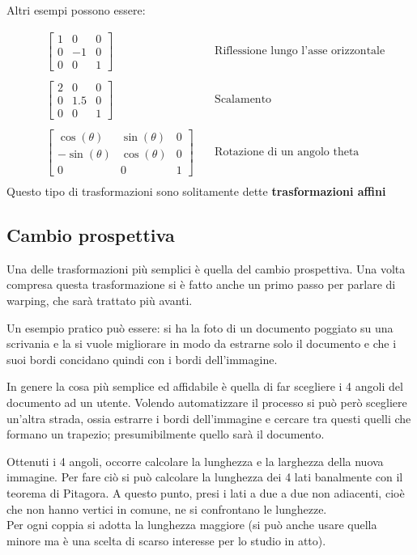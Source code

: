 \noindent 
Altri esempi possono essere:

\begin{align*}
&\begin{bmatrix}
1&0&0\\
0&-1&0\\
0&0&1
\end{bmatrix}&~&
\text{Riflessione lungo l'asse orizzontale}\\
\\
&\begin{bmatrix}
2&0&0\\
0&1.5&0\\
0&0&1
\end{bmatrix}&~&
\text{Scalamento}\\
\\
&\begin{bmatrix}
\cos(\theta )&\sin(\theta )&0\\
-\sin(\theta )&\cos(\theta )&0\\
0&0&1
\end{bmatrix}&~&
\text{Rotazione di un angolo theta}\\
\end{align*}
Questo tipo di trasformazioni sono solitamente dette \textbf{trasformazioni affini}



\subsection{Cambio prospettiva}
Una delle trasformazioni più semplici è quella del cambio prospettiva. Una volta compresa questa trasformazione si è fatto anche un primo passo per parlare di warping, che sarà trattato più avanti.

\vspace{1em} \noindent
Un esempio pratico può essere: si ha la foto di un documento poggiato su una scrivania e la si vuole migliorare in modo da estrarne solo il documento e che i suoi bordi concidano quindi con i bordi dell'immagine.

\vspace{1em} \noindent
In genere la cosa più semplice ed affidabile è quella di far scegliere i 4 angoli del documento ad un utente. Volendo automatizzare il processo si può però scegliere un'altra strada, ossia estrarre i bordi dell'immagine e cercare tra questi quelli che formano un trapezio; presumibilmente quello sarà il documento.

\vspace{1em} \noindent
Ottenuti i 4 angoli, occorre calcolare la lunghezza e la larghezza della nuova immagine. Per fare ciò si può calcolare la lunghezza dei 4 lati banalmente con il teorema di Pitagora. A questo punto, presi i lati a due a due non adiacenti, cioè che non hanno vertici in comune, ne si confrontano le lunghezze.\\
Per ogni coppia si adotta la lunghezza maggiore (si può anche usare quella minore ma è una scelta di scarso interesse per lo studio in atto).

